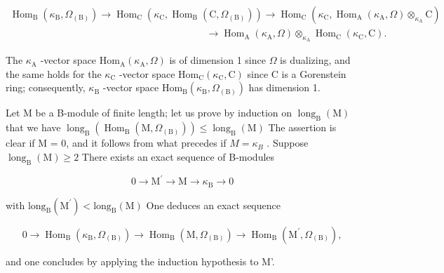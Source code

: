 \[
\begin{array}{c} \operatorname{Hom} _ {\mathrm{B}} (\kappa_ {\mathrm{B}}, \Omega_ {(\mathrm{B})}) \longrightarrow \operatorname{Hom} _ {\mathrm{C}} (\kappa_ {\mathrm{C}}, \operatorname{Hom} _ {\mathrm{B}} (\mathrm{C}, \Omega_ {(\mathrm{B})})) \longrightarrow \operatorname{Hom} _ {\mathrm{C}} (\kappa_ {\mathrm{C}}, \operatorname{Hom} _ {\mathrm{A}} (\kappa_ {\mathrm{A}}, \Omega) \otimes_ {\kappa_ {\mathrm{A}}} \mathrm{C}) \\ \qquad \qquad \qquad \qquad \qquad \qquad \qquad \qquad \qquad \qquad \longrightarrow \operatorname{Hom} _ {\mathrm{A}} (\kappa_ {\mathrm{A}}, \Omega) \otimes_ {\kappa_ {\mathrm{A}}} \operatorname{Hom} _ {\mathrm{C}} (\kappa_ {\mathrm{C}}, \mathrm{C}). \end{array}
\]

The \(\kappa_{\mathrm{A}}\) -vector space \(\mathrm{Hom}_{\mathrm{A}}(\kappa_{\mathrm{A}}, \Omega)\) is of dimension 1 since \(\Omega\) is dualizing, and the same holds for the \(\kappa_{\mathrm{C}}\) -vector space \(\mathrm{Hom}_{\mathrm{C}}(\kappa_{\mathrm{C}}, \mathrm{C})\) since C is a Gorenstein ring; consequently, \(\kappa_{\mathrm{B}}\) -vector space \(\mathrm{Hom}_{\mathrm{B}}(\kappa_{\mathrm{B}}, \Omega_{(\mathrm{B})})\) has dimension 1.

Let M be a B-module of finite length; let us prove by induction on \(\operatorname{long}_{\mathrm{B}}(\mathrm{M})\) that we have \(\operatorname{long}_{\mathrm{B}}(\operatorname{Hom}_{\mathrm{B}}(\mathrm{M},\Omega_{(\mathrm{B})})) \leqslant \operatorname{long}_{\mathrm{B}}(\mathrm{M})\) The assertion is clear if M = 0, and it follows from what precedes if \(M = \kappa_{B}\) . Suppose \(\operatorname{long}_{\mathrm{B}}(\mathrm{M}) \geqslant 2\) There exists an exact sequence of B-modules

\[
0 \rightarrow \mathrm{M} ^ {\prime} \rightarrow \mathrm{M} \rightarrow \kappa_ {\mathrm{B}} \rightarrow 0
\]

with \(\mathrm{long}_{\mathrm{B}}(\mathrm{M}^{\prime}) < \mathrm{long}_{\mathrm{B}}(\mathrm{M})\) One deduces an exact sequence

\[
0 \to \operatorname{Hom} _ {\mathrm{B}} (\kappa_ {\mathrm{B}}, \Omega_ {(\mathrm{B})}) \to \operatorname{Hom} _ {\mathrm{B}} (\mathrm{M}, \Omega_ {(\mathrm{B})}) \to \operatorname{Hom} _ {\mathrm{B}} (\mathrm{M} ^ {\prime}, \Omega_ {(\mathrm{B})}),
\]

and one concludes by applying the induction hypothesis to M'.

